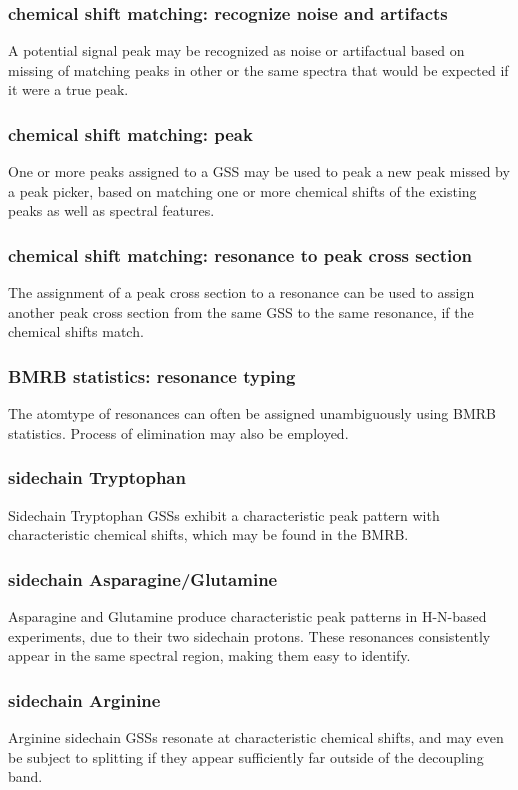 \subsubsection{chemical shift matching: recognize noise and artifacts}
A potential signal peak may be recognized as noise or artifactual based on
missing of matching peaks in other or the same spectra that would be expected
if it were a true peak.

\subsubsection{chemical shift matching: peak}
One or more peaks assigned to a GSS may be used to peak a new peak missed by a
peak picker, based on matching one or more chemical shifts of the existing peaks
as well as spectral features.

\subsubsection{chemical shift matching: resonance to peak cross section}
The assignment of a peak cross section to a resonance can be used to assign another
peak cross section from the same GSS to the same resonance, if the chemical shifts
match.

\subsubsection{BMRB statistics: resonance typing}
The atomtype of resonances can often be assigned unambiguously using BMRB
statistics.  Process of elimination may also be employed.

\subsubsection{sidechain Tryptophan}
Sidechain Tryptophan GSSs exhibit a characteristic peak pattern with 
characteristic chemical shifts, which may be found in the BMRB.

\subsubsection{sidechain Asparagine/Glutamine}
Asparagine and Glutamine produce characteristic peak patterns in H-N-based 
experiments, due to their two sidechain protons.  These resonances consistently
appear in the same spectral region, making them easy to identify.

\subsubsection{sidechain Arginine}
Arginine sidechain GSSs resonate at characteristic chemical shifts, and may
even be subject to splitting if they appear sufficiently far outside of the
decoupling band.

